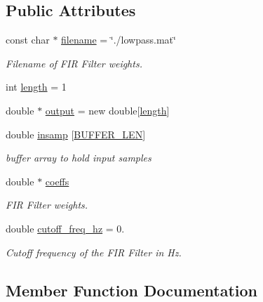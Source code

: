\subsection*{Public Attributes}
\begin{DoxyCompactItemize}
\item 
const char $\ast$ \hyperlink{classFIRFilter_a902770591db045df300f22910625c62a}{filename} = \char`\"{}./lowpass.\+mat\char`\"{}
\begin{DoxyCompactList}\small\item\em Filename of F\+IR Filter weights. \end{DoxyCompactList}\item 
int \hyperlink{classFIRFilter_a4e697a78993656c942005939a3439b3f}{length} = 1
\item 
double $\ast$ \hyperlink{classFIRFilter_a459c9679495d712b1324c559c97f573e}{output} = new double\mbox{[}\hyperlink{classFIRFilter_a4e697a78993656c942005939a3439b3f}{length}\mbox{]}
\item 
double \hyperlink{classFIRFilter_a9a3f96578a96a8dd1fce63635483d609}{insamp} \mbox{[}\hyperlink{KinovaHMICartesianControl_2CartesianControl_8h_a46130dc86f2322714bba26960b64e7bb}{B\+U\+F\+F\+E\+R\+\_\+\+L\+EN}\mbox{]}
\begin{DoxyCompactList}\small\item\em buffer array to hold input samples \end{DoxyCompactList}\item 
double $\ast$ \hyperlink{classFIRFilter_a3f3bc115df8482bf63aa0e6adcee0516}{coeffs}
\begin{DoxyCompactList}\small\item\em F\+IR Filter weights. \end{DoxyCompactList}\item 
double \hyperlink{classFIRFilter_a038a40d113cdbcdef9d215f79d5e22bf}{cutoff\+\_\+freq\+\_\+hz} = 0.
\begin{DoxyCompactList}\small\item\em Cutoff frequency of the F\+IR Filter in Hz. \end{DoxyCompactList}\end{DoxyCompactItemize}


\subsection{Member Function Documentation}
